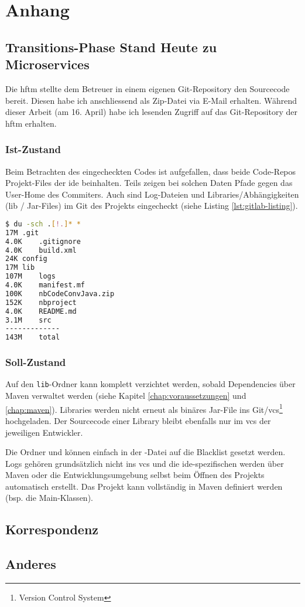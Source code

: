 \chapter{Anhang}
\section{Transitions-Phase Stand Heute zu Microservices}
Die \acrshort{hftm} stellte dem Betreuer in einem eigenen Git-Repository den Sourcecode bereit. Diesen habe ich anschliessend als Zip-Datei via E-Mail erhalten. Während dieser Arbeit (am 16. April) habe ich lesenden Zugriff auf das Git-Repository der \acrshort{hftm} erhalten\cite{gitlab.com/solidus/hefei}. 

\subsection{Ist-Zustand}
Beim Betrachten des eingecheckten Codes ist aufgefallen, dass beide Code-Repos Projekt-Files der \acrshort{ide} beinhalten. Teils zeigen bei solchen Daten Pfade gegen das User-Home des Commiters. Auch sind Log-Dateien und Libraries/Abhängigkeiten (lib / Jar-Files) im Git des Projekts eingecheckt (siehe Listing \ref{lst:gitlab-listing}). 
\begin{lstlisting}[caption={Listing der Daten im Git-Repository 'gitlab.com/solidus/hefei'},language=Bash, columns=fixed,label={lst:gitlab-listing}]
$ du -sch .[!.]* *
17M	.git
4.0K	.gitignore
4.0K	build.xml
24K	config
17M	lib
107M	logs
4.0K	manifest.mf
100K	nbCodeConvJava.zip
152K	nbproject
4.0K	README.md
3.1M	src
-------------
143M	total
\end{lstlisting}
\subsection{Soll-Zustand}
Auf den \verb|lib|-Ordner kann komplett verzichtet werden, sobald Dependencies über Maven verwaltet werden (siehe Kapitel \ref{chap:voraussetzungen} und \ref{chap:maven}). Libraries werden nicht erneut als binäres Jar-File ins Git/\acrshort{vcs}\footnote{Version Control System} hochgeladen. Der Sourcecode einer Library bleibt ebenfalls nur im \acrshort{vcs} der jeweiligen Entwickler.

Die Ordner  und  können einfach in der -Datei auf die Blacklist gesetzt werden. Logs gehören grundsätzlich nicht ins \acrshort{vcs} und die \acrshort{ide}-spezifischen werden über Maven oder die Entwicklungsumgebung selbst beim Öffnen des Projekts automatisch erstellt. Das Projekt kann vollständig in Maven definiert werden (bsp. die Main-Klassen).

\section{Korrespondenz}
\section{Anderes}

